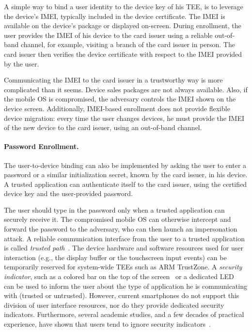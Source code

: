 A simple way to bind a user identity to the device key of his TEE, is to
leverage the device's IMEI, typically included in the device certificate.  The
IMEI is available on the device's package or displayed on-screen.  During
enrollment, the user provides the IMEI of his device to the card issuer using a
reliable out-of-band channel, for example, visiting a branch of the card issuer
in person. The card issuer then verifies the device certificate with respect to
the IMEI provided by the user.

Communicating the IMEI to the card issuer in a trustworthy way is more
complicated than it seems.  Device sales packages are not always available.
Also, if the mobile OS is compromised, the adversary controls the IMEI shown on
the device screen.  Additionally, IMEI-based enrollment does not provide
flexible device migration: every time the user changes devices, he must provide
the IMEI of the new device to the card issuer, using an out-of-band channel.

\paragraph{Password Enrollment.}

The user-to-device binding can also be implemented by asking the user to enter a
password or a similar initialization secret, known by the card issuer, in his
device.  A trusted application can authenticate itself to the card issuer, using
the certified device key and the user-provided password.

The user should type in the password only when a trusted application can
securely receive it. The compromised mobile OS can otherwise intercept and
forward the password to the adversary, who can then launch an impersonation
attack. A reliable communication interface from the user to a trusted
application is called \emph{trusted path}~\cite{yee2002icics, ye2005tissec}. The
device hardware and software resources used for user interaction (e.g., the
display buffer or the touchscreen input events) can be temporarily reserved for
system-wide TEEs such as ARM TrustZone.  A \emph{security indicator}, such as a
colored bar on the top of the screen~\cite{selhorst10trust} or a dedicated
LED~\cite{armTZslides} can be used to inform the user about the type of
application he is communicating with (trusted or untrusted). However, current
smartphones do not support this division of user interface resources, nor do
they provide dedicated security indicators. Furthermore, several academic
studies, and a few decades of practical experience, have shown that users tend
to ignore security indicators~\cite{schechter07sp, egelman2008chi,
  jackson2007usec}.


